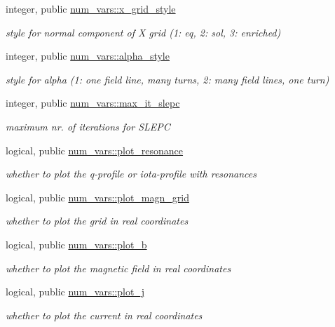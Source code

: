 \begin{DoxyCompactItemize}
integer, public \hyperlink{namespacenum__vars_a72c4ea80e13135b4c314f3f9d3bfdc81}{num\+\_\+vars\+::x\+\_\+grid\+\_\+style}
\begin{DoxyCompactList}\small\item\em style for normal component of X grid (1\+: eq, 2\+: sol, 3\+: enriched) \end{DoxyCompactList}\item 
integer, public \hyperlink{namespacenum__vars_aa3b575dadc3dc227a57d52b118408d62}{num\+\_\+vars\+::alpha\+\_\+style}
\begin{DoxyCompactList}\small\item\em style for alpha (1\+: one field line, many turns, 2\+: many field lines, one turn) \end{DoxyCompactList}\item 
integer, public \hyperlink{namespacenum__vars_a8855ce3cc66743410c56c1dfecbc6a1a}{num\+\_\+vars\+::max\+\_\+it\+\_\+slepc}
\begin{DoxyCompactList}\small\item\em maximum nr. of iterations for S\+L\+E\+PC \end{DoxyCompactList}\item 
logical, public \hyperlink{namespacenum__vars_a70fd85a310da008203347f25b0043238}{num\+\_\+vars\+::plot\+\_\+resonance}
\begin{DoxyCompactList}\small\item\em whether to plot the q-\/profile or iota-\/profile with resonances \end{DoxyCompactList}\item 
logical, public \hyperlink{namespacenum__vars_ad6bbee854ff7479d1d2ded83cda04699}{num\+\_\+vars\+::plot\+\_\+magn\+\_\+grid}
\begin{DoxyCompactList}\small\item\em whether to plot the grid in real coordinates \end{DoxyCompactList}\item 
logical, public \hyperlink{namespacenum__vars_a09ac710a02758a271706d96e50e5c1b1}{num\+\_\+vars\+::plot\+\_\+b}
\begin{DoxyCompactList}\small\item\em whether to plot the magnetic field in real coordinates \end{DoxyCompactList}\item 
logical, public \hyperlink{namespacenum__vars_aa5519c9217b33a3a677e058723638fa9}{num\+\_\+vars\+::plot\+\_\+j}
\begin{DoxyCompactList}\small\item\em whether to plot the current in real coordinates \end{DoxyCompactList}\item 

\end{DoxyCompactItemize}
